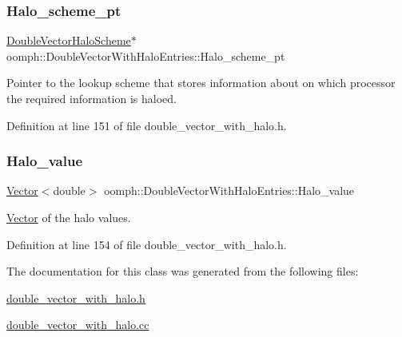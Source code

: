 \subsubsection{\texorpdfstring{Halo\+\_\+scheme\+\_\+pt}{Halo\_scheme\_pt}}
{\footnotesize\ttfamily \hyperlink{classoomph_1_1DoubleVectorHaloScheme}{Double\+Vector\+Halo\+Scheme}$\ast$ oomph\+::\+Double\+Vector\+With\+Halo\+Entries\+::\+Halo\+\_\+scheme\+\_\+pt\hspace{0.3cm}{\ttfamily [private]}}



Pointer to the lookup scheme that stores information about on which processor the required information is haloed. 



Definition at line 151 of file double\+\_\+vector\+\_\+with\+\_\+halo.\+h.

\mbox{\label{classoomph_1_1DoubleVectorWithHaloEntries_ac2b04ca1db09db85401e0d59a225856b}} 
\subsubsection{\texorpdfstring{Halo\+\_\+value}{Halo\_value}}
{\footnotesize\ttfamily \hyperlink{classoomph_1_1Vector}{Vector}$<$double$>$ oomph\+::\+Double\+Vector\+With\+Halo\+Entries\+::\+Halo\+\_\+value\hspace{0.3cm}{\ttfamily [private]}}



\hyperlink{classoomph_1_1Vector}{Vector} of the halo values. 



Definition at line 154 of file double\+\_\+vector\+\_\+with\+\_\+halo.\+h.



The documentation for this class was generated from the following files\+:\begin{DoxyCompactItemize}
\item 
\hyperlink{double__vector__with__halo_8h}{double\+\_\+vector\+\_\+with\+\_\+halo.\+h}\item 
\hyperlink{double__vector__with__halo_8cc}{double\+\_\+vector\+\_\+with\+\_\+halo.\+cc}\end{DoxyCompactItemize}
